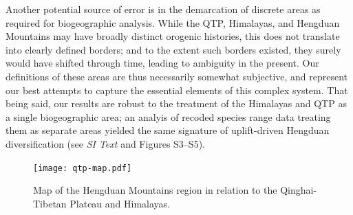 \documentclass[9pt,twocolumn,twoside,lineno]{pnas-new}
\begin{document}
Another potential source of error is in the demarcation of discrete
areas as required for biogeographic analysis. While the QTP,
Himalayas, and Hengduan Mountains may have broadly distinct orogenic
histories, this does not translate into clearly defined borders; and
to the extent such borders existed, they surely would have shifted
through time, leading to ambiguity in the present. Our definitions of
these areas are thus necessarily somewhat subjective, and represent
our best attempts to capture the essential elements of this complex
system. That being said, our results are robust to the treatment of
the Himalayas and QTP as a single biogeographic area; an analyis of
recoded species range data treating them as separate areas yielded the
same signature of uplift-driven Hengduan diversification (see
\textit{SI Text} and Figures S3--S5).

%



\begin{figure}
\centering
\texttt{[image: qtp-map.pdf]}
\caption{Map of the Hengduan Mountains region in relation to the
  Qinghai-Tibetan Plateau and Himalayas.}
\label{fig:map}
\end{figure}
\end{document}
